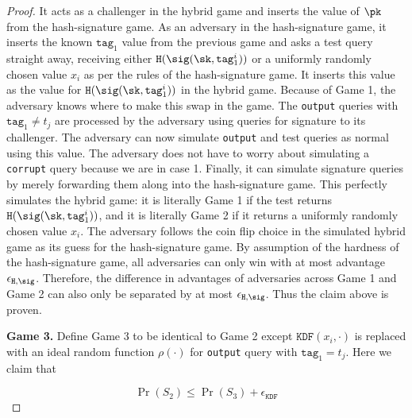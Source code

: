 \documentclass{article}
\begin{document}
{\begin{proof}
It acts as a challenger in the hybrid game and inserts the value of $\pk$ from the hash-signature game. As an adversary in the hash-signature game, it inserts the known $\texttt{tag}_1$ value from the previous game and asks a test query straight away, receiving either $ \texttt{H}(\sig (\sk, \texttt{tag}_1^i))$ or a uniformly randomly chosen value $x_i$ as per the rules of the hash-signature game. It inserts this value as the value for $ \texttt{H}(\sig (\sk, \texttt{tag}_1^i))$ in the hybrid game. Because of Game 1, the adversary knows where to make this swap in the game. The \texttt{output} queries with $\texttt{tag}_1 \neq t_j$ are processed by the adversary using queries for signature to its challenger.  The adversary can now simulate \texttt{output} and test queries as normal using this value. The adversary does not have to worry about simulating a \texttt{corrupt} query because we are in case 1. Finally, it can simulate signature queries by merely forwarding them along into the hash-signature game. This perfectly simulates the hybrid game: it is literally Game 1 if the test returns $ \texttt{H}(\sig (\sk, \texttt{tag}_1^i))$, and it is literally Game 2 if it returns a uniformly randomly chosen value $x_i$. The adversary follows the coin flip choice in the simulated hybrid game as its guess for the hash-signature game. By assumption of the hardness of the hash-signature game, all adversaries can only win with at most advantage $\epsilon_{\texttt{H}, \sig}$. Therefore, the difference in advantages of adversaries across Game 1 and Game 2 can also only be separated by at most $\epsilon_{\texttt{H}, \sig}$. Thus the claim above is proven.

\noindent \textbf{Game 3.} Define Game 3 to be identical to Game 2 except 
$\texttt{KDF}(x_i,\cdot)$ is replaced with an ideal random function $\rho(\cdot)$ for \texttt{output} query with $\texttt{tag}_1 =t_j$. Here we claim that

$$
\Pr(S_2) \le \Pr(S_3) + \epsilon_{\texttt{KDF}}
$$


\end{proof}}
\end{document}
